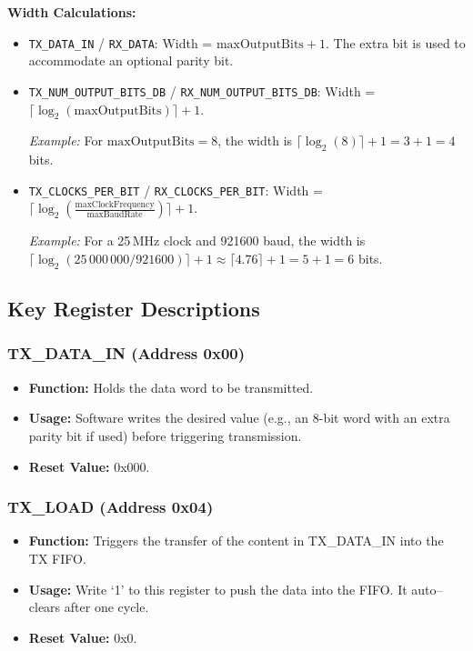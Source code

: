 \textbf{Width Calculations:}
\begin{itemize}
    \item \texttt{TX\_DATA\_IN} / \texttt{RX\_DATA}: Width = \(\text{maxOutputBits}+1\). The extra bit is used to accommodate an optional parity bit.
    \item \texttt{TX\_NUM\_OUTPUT\_BITS\_DB} / \texttt{RX\_NUM\_OUTPUT\_BITS\_DB}: Width = \(\lceil\log_2(\text{maxOutputBits})\rceil+1\).
    
    \textit{Example:} For \(\text{maxOutputBits}=8\), the width is \(\lceil\log_2(8)\rceil+1 = 3+1 = 4\) bits.
    
    \item \texttt{TX\_CLOCKS\_PER\_BIT} / \texttt{RX\_CLOCKS\_PER\_BIT}: Width = \(\lceil\log_2(\tfrac{\text{maxClockFrequency}}{\text{maxBaudRate}})\rceil+1\).
    
    \textit{Example:} For a 25\,MHz clock and 921600 baud, the width is \(\lceil\log_2(25\,000\,000/921600)\rceil+1 \approx \lceil4.76\rceil+1 = 5+1 = 6\) bits.
\end{itemize}

\subsection{Key Register Descriptions}

\subsubsection{TX\_DATA\_IN (Address 0x00)}
\begin{itemize}[noitemsep]
    \item \textbf{Function:} Holds the data word to be transmitted.
    \item \textbf{Usage:} Software writes the desired value (e.g., an 8-bit word with an extra parity bit if used) before triggering transmission.
    \item \textbf{Reset Value:} 0x000.
\end{itemize}

\subsubsection{TX\_LOAD (Address 0x04)}
\begin{itemize}[noitemsep]
    \item \textbf{Function:} Triggers the transfer of the content in TX\_DATA\_IN into the TX FIFO.
    \item \textbf{Usage:} Write ‘1’ to this register to push the data into the FIFO. It auto–clears after one cycle.
    \item \textbf{Reset Value:} 0x0.
\end{itemize}

